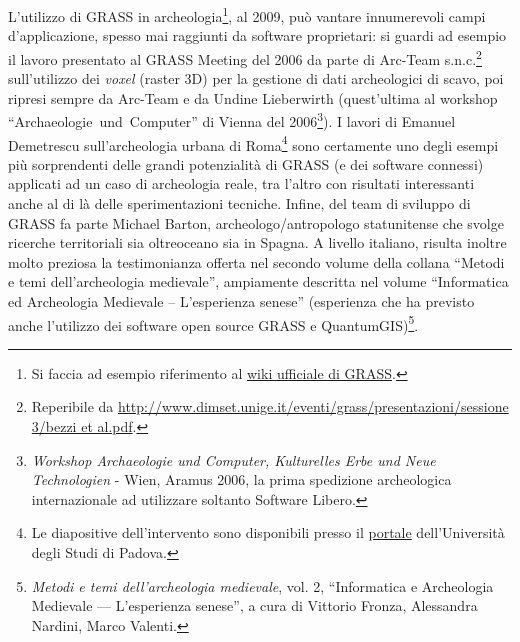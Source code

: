 \documentclass{article}
\begin{document}
\begin{multicols}{2}
			L'utilizzo di GRASS in archeologia\footnote{Si faccia ad esempio riferimento al \href{http://grass.osgeo.org/wiki/Archeology}{wiki ufficiale di GRASS}.}, al 2009, può vantare innumerevoli campi d'applicazione, spesso mai raggiunti da software proprietari: si guardi ad esempio il lavoro presentato al GRASS Meeting del 2006 da parte di Arc-Team s.n.c.\footnote{Reperibile da \href{file:http://www.dimset.unige.it/eventi/grass/presentazioni/sessione 3/bezzi et al.pdf}{http://www.dimset.unige.it/eventi/grass/presentazioni/sessione 3/bezzi et al.pdf}.} sull'utilizzo dei \emph{voxel} (raster 3D) per la gestione di dati archeologici di scavo, poi ripresi sempre da Arc-Team e da Undine Lieberwirth (quest'ultima al workshop ``Archaeologie~und~Computer'' di Vienna del 2006\footnote{\emph{Workshop Archaeologie und Computer, Kulturelles Erbe und Neue Technologien} - Wien, Aramus 2006, la prima spedizione archeologica internazionale ad utilizzare soltanto Software Libero.}). I lavori di Emanuel Demetrescu sull'archeologia urbana di Roma\footnote{Le diapositive dell'intervento sono disponibili presso il \href{file:http://www.perseo.lettere.unipd.it/workshop08/lib/exe/fetch.php?id=download&cache=cache&media=workshop08:documenti:demetrescu_lic.odp}{portale} dell'Università degli Studi di Padova.} sono certamente uno degli esempi più sorprendenti delle grandi potenzialità di GRASS (e dei software connessi) applicati ad un caso di archeologia reale, tra l'altro con risultati interessanti anche al di là delle sperimentazioni tecniche. Infine, del team di sviluppo di GRASS fa parte Michael Barton, archeologo/antropologo statunitense che svolge ricerche territoriali sia oltreoceano sia in Spagna. A livello italiano, risulta inoltre molto preziosa la testimonianza offerta nel secondo volume della collana ``Metodi e temi dell'archeologia medievale'', ampiamente descritta nel volume ``Informatica ed Archeologia Medievale -- L'esperienza senese'' (esperienza che ha previsto anche l'utilizzo dei software open source GRASS e QuantumGIS)\footnote{\emph{Metodi e temi dell'archeologia medievale}, vol. 2, ``Informatica e Archeologia Medievale --- L'esperienza senese'', a cura di Vittorio Fronza, Alessandra Nardini, Marco Valenti.}.


\end{multicols}
\end{document}
